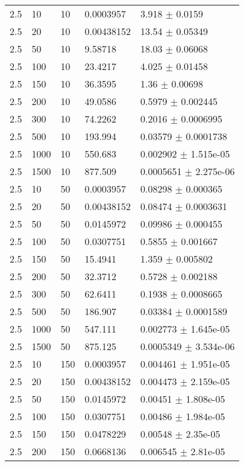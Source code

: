 \begin{longtable}{lllll}
 2.5 &    10 &    10 & 0.0003957 &    3.918 $\pm$   0.0159 \\
 2.5 &    20 &    10 & 0.00438152 &    13.54 $\pm$  0.05349 \\
 2.5 &    50 &    10 &  9.58718 &    18.03 $\pm$  0.06068 \\
 2.5 &   100 &    10 &  23.4217 &    4.025 $\pm$  0.01458 \\
 2.5 &   150 &    10 &  36.3595 &     1.36 $\pm$  0.00698 \\
 2.5 &   200 &    10 &  49.0586 &   0.5979 $\pm$ 0.002445 \\
 2.5 &   300 &    10 &  74.2262 &   0.2016 $\pm$ 0.0006995 \\
 2.5 &   500 &    10 &  193.994 &  0.03579 $\pm$ 0.0001738 \\
 2.5 &  1000 &    10 &  550.683 & 0.002902 $\pm$ 1.515e-05 \\
 2.5 &  1500 &    10 &  877.509 & 0.0005651 $\pm$ 2.275e-06 \\
 2.5 &    10 &    50 & 0.0003957 &  0.08298 $\pm$ 0.000365 \\
 2.5 &    20 &    50 & 0.00438152 &  0.08474 $\pm$ 0.0003631 \\
 2.5 &    50 &    50 & 0.0145972 &  0.09986 $\pm$ 0.000455 \\
 2.5 &   100 &    50 & 0.0307751 &   0.5855 $\pm$ 0.001667 \\
 2.5 &   150 &    50 &  15.4941 &    1.359 $\pm$ 0.005802 \\
 2.5 &   200 &    50 &  32.3712 &   0.5728 $\pm$ 0.002188 \\
 2.5 &   300 &    50 &  62.6411 &   0.1938 $\pm$ 0.0008665 \\
 2.5 &   500 &    50 &  186.907 &  0.03384 $\pm$ 0.0001589 \\
 2.5 &  1000 &    50 &  547.111 & 0.002773 $\pm$ 1.645e-05 \\
 2.5 &  1500 &    50 &  875.125 & 0.0005349 $\pm$ 3.534e-06 \\
 2.5 &    10 &   150 & 0.0003957 & 0.004461 $\pm$ 1.951e-05 \\
 2.5 &    20 &   150 & 0.00438152 & 0.004473 $\pm$ 2.159e-05 \\
 2.5 &    50 &   150 & 0.0145972 &  0.00451 $\pm$ 1.808e-05 \\
 2.5 &   100 &   150 & 0.0307751 &  0.00486 $\pm$ 1.984e-05 \\
 2.5 &   150 &   150 & 0.0478229 &  0.00548 $\pm$ 2.35e-05 \\
 2.5 &   200 &   150 & 0.0668136 & 0.006545 $\pm$ 2.81e-05 \\

\end{longtable}
